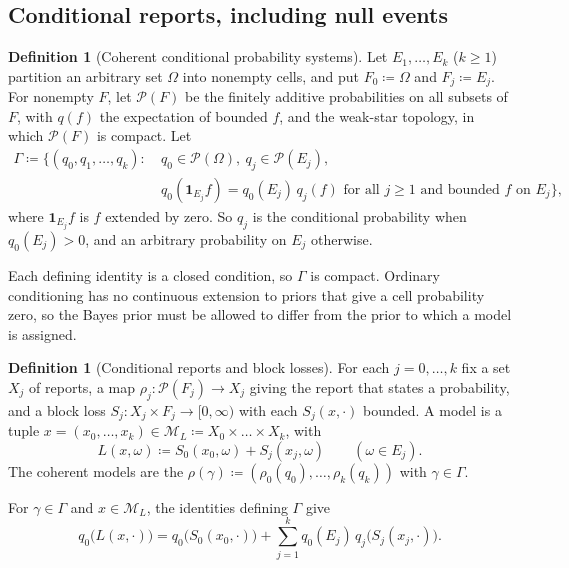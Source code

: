\documentclass[11pt]{article}
\theoremstyle{definition}
\newtheorem{definition}[theorem]{Definition}
\theoremstyle{remark}
\newcommand{\M}{\mathcal M}
\newcommand{\PP}{\mathcal P}
\newcommand{\one}{\mathbf 1}
\begin{document}
\subsection{Conditional reports, including null events}\label{sec:conditional}
\begin{definition}[Coherent conditional probability systems]\label{def:conditional-systems}
Let $E_1,\dots,E_k$ ($k\ge1$) partition an arbitrary set $\Omega$ into nonempty cells, and put $F_0\coloneqq\Omega$ and $F_j\coloneqq E_j$. For nonempty $F$, let $\PP(F)$ be the finitely additive probabilities on all subsets of $F$, with $q(f)$ the expectation of bounded $f$, and the weak-star topology, in which $\PP(F)$ is compact. Let
\[
\begin{aligned}
\Gamma\coloneqq\bigl\{(q_0,q_1,\dots,q_k):\ & q_0\in\PP(\Omega),\ q_j\in\PP(E_j),\\
& q_0(\one_{E_j}f)=q_0(E_j)\,q_j(f)\text{ for all }j\ge1\text{ and bounded }f\text{ on }E_j\bigr\},
\end{aligned}
\]
where $\one_{E_j}f$ is $f$ extended by zero. So $q_j$ is the conditional probability when $q_0(E_j)>0$, and an arbitrary probability on $E_j$ otherwise.
\end{definition}

Each defining identity is a closed condition, so $\Gamma$ is compact. Ordinary conditioning has no continuous extension to priors that give a cell probability zero, so the Bayes prior must be allowed to differ from the prior to which a model is assigned.

\begin{definition}[Conditional reports and block losses]\label{def:block-reports}
For each $j=0,\dots,k$ fix a set $X_j$ of reports, a map $\rho_j:\PP(F_j)\to X_j$ giving the report that states a probability, and a block loss $S_j:X_j\times F_j\to[0,\infty)$ with each $S_j(x,\cdot)$ bounded. A model is a tuple $x=(x_0,\dots,x_k)\in\M_L\coloneqq X_0\times\dots\times X_k$, with
\[
L(x,\omega)\coloneqq S_0(x_0,\omega)+S_j(x_j,\omega)\qquad(\omega\in E_j).
\]
The coherent models are the $\rho(\gamma)\coloneqq(\rho_0(q_0),\dots,\rho_k(q_k))$ with $\gamma\in\Gamma$.
\end{definition}

For $\gamma\in\Gamma$ and $x\in\M_L$, the identities defining $\Gamma$ give
\begin{equation}\label{eq:blocks}
q_0\bigl(L(x,\cdot)\bigr)=q_0\bigl(S_0(x_0,\cdot)\bigr)+\sum_{j=1}^kq_0(E_j)\,q_j\bigl(S_j(x_j,\cdot)\bigr).
\end{equation}
\end{document}
